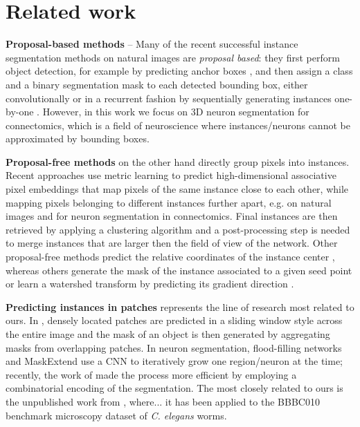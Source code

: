 
\section{Related work} \label{sec:related_work}
\textbf{Proposal-based methods} -- Many of the recent successful instance segmentation methods on natural images are \emph{proposal based}: they first perform object detection, for example by predicting anchor boxes \cite{ren2015faster}, and then assign a class and a binary segmentation mask to each detected bounding box, either convolutionally \cite{he2017mask,porzi2019seamless,liu2018path,yang2012layered,li2017fully,ladicky2010and,hariharan2014simultaneous,chen2015multi,dai2016instance,liang2016reversible} or in a recurrent fashion by sequentially generating instances one-by-one \cite{romera2016recurrent,ren2017end}. 
However, in this work we focus on 3D neuron segmentation for connectomics, which is a field of neuroscience where instances/neurons cannot be approximated by bounding boxes. 

\textbf{Proposal-free methods} on the other hand directly group pixels into instances. 
Recent approaches use metric learning to predict high-dimensional associative pixel embeddings that map pixels of the same instance close to each other, while mapping pixels belonging to different instances further apart, e.g. \cite{kong2018recurrentPix,fathi2017semantic,newell2017associative,de2017semantic} on natural images and \cite{lee2019learning} for neuron segmentation in connectomics. %
Final instances are then retrieved by applying a clustering algorithm and a post-processing step is needed to merge instances that are larger then the field of view of the network. 
Other proposal-free methods predict the relative coordinates of the instance center \cite{neven2019instance,cheng2019panopticdeeplab}, whereas others generate the mask of the instance associated to a given seed point \cite{sofiiuk2019adaptis} or  
learn a watershed transform by predicting its gradient direction \cite{bai2017deep}. 

\textbf{Predicting instances in patches} represents the line of research most related to ours. 
In \cite{liu2016multi}, densely located patches are predicted in a sliding window style across the entire image and the mask of an object is then generated by aggregating masks from overlapping patches.
In neuron segmentation, flood-filling networks \cite{januszewski2018high} and MaskExtend \cite{meirovitch2016multi} use a CNN to iteratively grow one region/neuron at the time; recently, the work of \cite{meirovitch2019cross} made the process more efficient by employing a combinatorial encoding of the segmentation.
The most closely related to ours is the unpublished work from \cite{hirsch2020patchperpix}, where... it has been applied to the BBBC010 benchmark microscopy dataset of \emph{C. elegans} worms.


